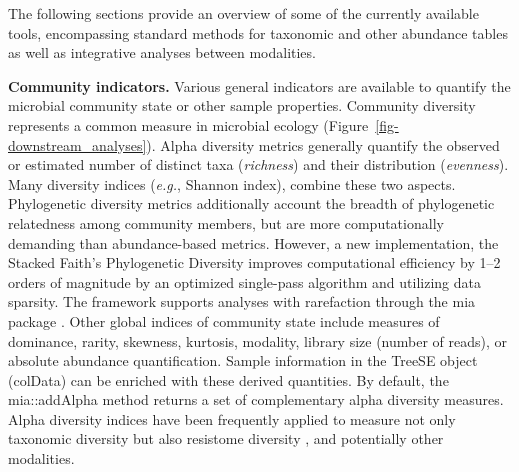 \documentclass[
  sn-nature,
]{sn-jnl}
\begin{document}
The following sections provide an overview of some of the currently
available tools, encompassing standard methods for taxonomic and other
abundance tables as well as integrative analyses between modalities.

\textbf{Community indicators.} Various general indicators are available
to quantify the microbial community state or other sample properties.
Community diversity represents a common measure in microbial ecology
\citep{bastiaanssen_bugs1_2023} (Figure~\ref{fig-downstream_analyses}).
Alpha diversity metrics generally quantify the observed or estimated
number of distinct taxa (\emph{richness}) and their distribution
(\emph{evenness}). Many diversity indices (\emph{e.g.}, Shannon index),
combine these two aspects. Phylogenetic diversity metrics additionally
account the breadth of phylogenetic relatedness among community members,
but are more computationally demanding than abundance-based metrics.
However, a new implementation, the Stacked Faith's Phylogenetic
Diversity improves computational efficiency by 1--2 orders of magnitude
\citep{armstrong2021} by an optimized single-pass algorithm and
utilizing data sparsity. The framework supports analyses with
rarefaction through the mia package \citep{schloss2024b}. Other global
indices of community state include measures of dominance, rarity,
skewness, kurtosis, modality, library size (number of reads), or
absolute abundance quantification. Sample information in the TreeSE
object (colData) can be enriched with these derived quantities. By
default, the mia::addAlpha method returns a set of complementary alpha
diversity measures. Alpha diversity indices have been frequently applied
to measure not only taxonomic diversity but also resistome diversity
\citep{salehi2025}, and potentially other modalities.
\end{document}
